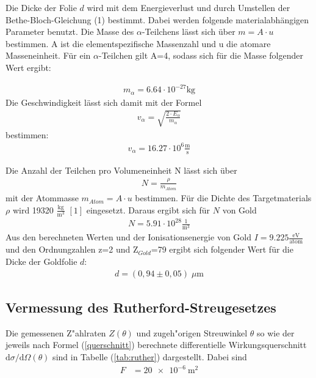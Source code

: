 Die Dicke der Folie $d$ wird mit dem Energieverlust und durch Umstellen der Bethe-Bloch-Gleichung (1) bestimmt. Dabei werden folgende materialabhängigen Parameter benutzt. Die Masse des $\alpha$-Teilchens lässt sich über $m=A \cdot u$ bestimmen. A ist die elementspezifische Massenzahl und u die atomare Masseneinheit. Für ein $\alpha$-Teilchen gilt A=4, sodass sich für die Masse folgender Wert ergibt: 

\begin{align*}
m_{\alpha}= 6.64 \cdot 10^{-27} \text{kg} 
\end{align*} 
Die Geschwindigkeit lässt sich damit mit der Formel 
\begin{align*}
v_{\alpha}= \sqrt{\frac{2\cdot E_{\alpha}}{m_{\alpha}}} 
\end{align*} 
bestimmen:
\begin{align*}
v_{\alpha}=16.27 \cdot 10^{6} \frac{\text{m}}{\text{s}}
\end{align*} 

Die Anzahl der Teilchen pro Volumeneinheit N lässt sich über \begin{align}
N= \frac{\rho}{m_{Atom}} 
\end{align} mit der Atommasse $m_{Atom}=A \cdot u$ bestimmen. 
Für die Dichte des Targetmaterials $\rho$ wird 19320 $\frac{\text{kg}}{\text{m}^3}$ $[1]$ eingesetzt. Daraus ergibt sich für $N$ von Gold 
 \begin{align*}
 N=5.91 \cdot 10^{28} \frac{1}{\text{m}^3}
 \end{align*} 
 Aus den berechneten Werten und der Ionisationsenergie von Gold $I=9.225 \frac{\text{eV}}{\text{atom}}$ und den Ordnungzahlen z=2 und Z$_{Gold}$=79 ergibt sich folgender Wert für die Dicke der Goldfolie $d$:
 \begin{align*}
 d= ( 0,94 \pm 0,05) \; \mu \text{m}
 \end{align*}

\subsection{Vermessung des Rutherford-Streugesetzes}
  Die gemessenen Z"ahlraten $Z(\theta)$ und zugeh"origen Streuwinkel $\theta$ so wie der jeweils nach Formel (\ref{querschnitt}) berechnete differentielle Wirkungsquerschnitt $\text{d}\sigma/\text{d}\Omega(\theta)$ sind in Tabelle (\ref{tab:ruther}) dargestellt.
  Dabei sind
  \begin{align*}
    F &= \SI{20e-6}{\meter \squared} \\
  \end{align*}


